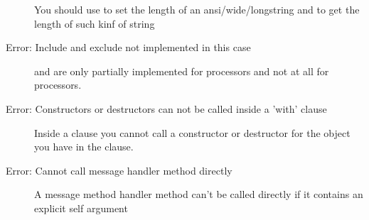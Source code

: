 \begin{description}
 You should use  to set the length of an ansi/wide/longstring
 and  to get the length of such kinf of string
\item [Error: Include and exclude not implemented in this case]
  and  are only partially
 implemented for  processors
 and not at all for  processors.
\item [Error: Constructors or destructors can not be called inside a 'with' clause]
 Inside a  clause you cannot call a constructor or destructor for the
 object you have in the  clause.
\item [Error: Cannot call message handler method directly]
 A message method handler method can't be called directly if it contains an
 explicit self argument
 \end{description}
